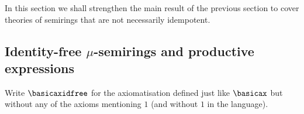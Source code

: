 \documentclass[runningheads]{amsart}
\begin{document}
In this section we shall strengthen the main result of the previous section to cover theories of semirings that are not necessarily idempotent.




    



\subsection{Identity-free $\mu$-semirings and productive expressions}

Write $\basicaxidfree$ for the axiomatisation defined just like $\basicax$ but without any of the axioms mentioning $1$ (and without $1$ in the language).
\end{document}
